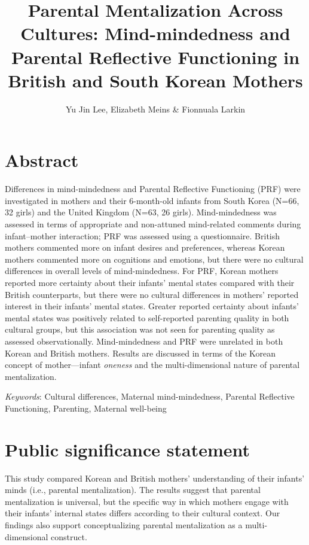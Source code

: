 \documentclass[
]{article}
\title{Parental Mentalization Across Cultures: Mind-mindedness and Parental Reflective Functioning in British and South Korean Mothers}
\author{Yu Jin Lee, Elizabeth Meins \& Fionnuala Larkin}
\date{}
\begin{document}
\maketitle

\hypertarget{abstract}{%
\section*{Abstract}\label{abstract}}

Differences in mind-mindedness and Parental Reflective Functioning (PRF) were investigated in mothers and their 6-month-old infants from South Korea (N=66, 32 girls) and the United Kingdom (N=63, 26 girls). Mind-mindedness was assessed in terms of appropriate and non-attuned mind-related comments during infant--mother interaction; PRF was assessed using a questionnaire. British mothers commented more on infant desires and preferences, whereas Korean mothers commented more on cognitions and emotions, but there were no cultural differences in overall levels of mind-mindedness. For PRF, Korean mothers reported more certainty about their infants' mental states compared with their British counterparts, but there were no cultural differences in mothers' reported interest in their infants' mental states. Greater reported certainty about infants' mental states was positively related to self-reported parenting quality in both cultural groups, but this association was not seen for parenting quality as assessed observationally. Mind-mindedness and PRF were unrelated in both Korean and British mothers. Results are discussed in terms of the Korean concept of mother---infant \emph{oneness} and the multi-dimensional nature of parental mentalization.

\emph{Keywords}: Cultural differences, Maternal mind-mindedness, Parental Reflective Functioning, Parenting, Maternal well-being

\hypertarget{public-significance-statement}{%
\section*{Public significance statement}\label{public-significance-statement}}

This study compared Korean and British mothers' understanding of their infants' minds (i.e., parental mentalization). The results suggest that parental mentalization is universal, but the specific way in which mothers engage with their infants' internal states differs according to their cultural context. Our findings also support conceptualizing parental mentalization as a multi-dimensional construct.
\end{document}
